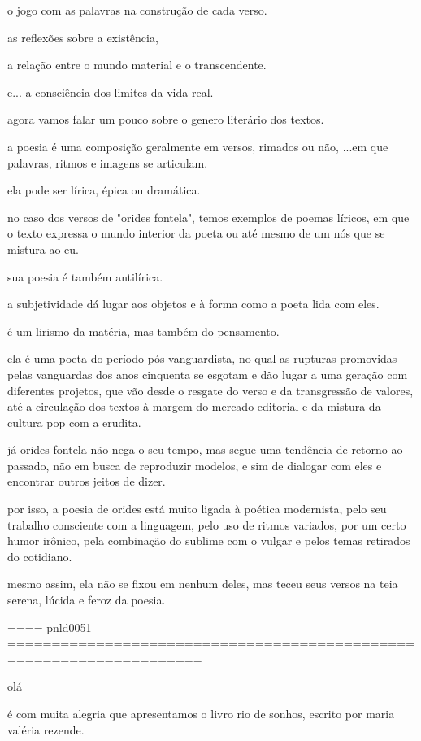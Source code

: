 o jogo com as palavras na construção de cada verso.

as reflexões sobre a existência,


a relação entre o mundo material e o transcendente.

e... a consciência dos limites da vida real.


agora vamos falar um pouco sobre o genero literário dos textos.



a poesia é uma composição geralmente em versos, rimados ou não, ...em que palavras, ritmos e imagens se articulam.

ela pode ser lírica, épica ou dramática.


no caso dos versos de "orides fontela", temos exemplos de poemas líricos, em que o texto expressa o mundo interior da poeta ou até mesmo de um nós que se mistura ao eu.

sua poesia é também antilírica.

a subjetividade dá lugar aos objetos e à forma como a poeta lida com eles.

é um lirismo da matéria, mas também do pensamento.


ela é uma poeta do período pós-vanguardista, no qual as rupturas promovidas pelas vanguardas dos anos cinquenta se esgotam e dão lugar a uma geração com diferentes projetos,
que vão desde o resgate do verso e da transgressão de valores,   até a circulação dos textos à margem do mercado editorial e da mistura da cultura pop com a erudita.



já orides fontela não nega o seu tempo,
mas segue uma tendência de retorno ao passado,
não em busca de reproduzir modelos, e sim de dialogar com eles e encontrar outros jeitos de dizer.

por isso, a poesia de orides está muito ligada à poética modernista, pelo seu trabalho consciente com a linguagem,
pelo uso de ritmos variados,
por um certo humor irônico,
pela combinação do sublime com o vulgar
e pelos temas retirados do cotidiano.

mesmo assim, ela não se fixou em nenhum deles, mas teceu seus versos na teia serena, lúcida e feroz da poesia.


==== pnld0051 ====================================================================

olá 

é com muita alegria  que apresentamos o livro  rio de sonhos, escrito por maria valéria rezende.

